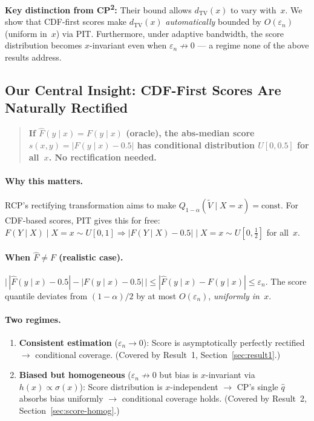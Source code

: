 \documentclass[11pt]{article}
\begin{document}
\textbf{Key distinction from CP\textsuperscript{2}:} Their bound allows
$d_{\mathrm{TV}}(x)$ to vary with~$x$. We show that CDF-first scores
make $d_{\mathrm{TV}}(x)$ \emph{automatically} bounded by $O(\varepsilon_n)$
(uniform in~$x$) via PIT. Furthermore, under adaptive bandwidth, the
score distribution becomes $x$-invariant even when $\varepsilon_n \not\to 0$
--- a regime none of the above results address.

\subsection{Our Central Insight: CDF-First Scores Are Naturally Rectified}
\label{sec:central-insight}

\begin{quote}
\textbf{If $\hat F(y \mid x) = F(y \mid x)$ (oracle), the abs-median
score $s(x,y) = |F(y \mid x) - 0.5|$ has conditional distribution
$U[0, 0.5]$ for all~$x$. No rectification needed.}
\end{quote}

\paragraph{Why this matters.}
RCP's rectifying transformation aims to make
$Q_{1-\alpha}(\tilde V \mid X = x) = \text{const}$. For CDF-based
scores, PIT gives this for free:
$F(Y \mid X) \mid X = x \sim U[0,1] \Rightarrow |F(Y \mid X) - 0.5|
\mid X = x \sim U[0, \tfrac{1}{2}]$ for all~$x$.

\paragraph{When $\hat F \neq F$ (realistic case).}
$\bigl|\, |\hat F(y \mid x) - 0.5| - |F(y \mid x) - 0.5|\, \bigr|
\le |\hat F(y \mid x) - F(y \mid x)| \le \varepsilon_n.$
The score quantile deviates from $(1-\alpha)/2$ by at most
$O(\varepsilon_n)$, \emph{uniformly in~$x$}.

\paragraph{Two regimes.}
\begin{enumerate}
  \item \textbf{Consistent estimation} ($\varepsilon_n \to 0$):
    Score is asymptotically perfectly rectified $\to$ conditional coverage.
    (Covered by Result~1, Section~\ref{sec:result1}.)

  \item \textbf{Biased but homogeneous} ($\varepsilon_n \not\to 0$ but
    bias is $x$-invariant via $h(x) \propto \sigma(x)$):
    Score distribution is $x$-independent $\to$ CP's single
    $\hat q$ absorbs bias uniformly $\to$ conditional coverage holds.
    (Covered by Result~2, Section~\ref{sec:score-homog}.)
\end{enumerate}
\end{document}
